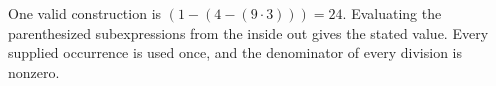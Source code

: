 One valid construction is $\boxed{(1-(4-(9\cdot 3)))=24}$. Evaluating the parenthesized subexpressions from the inside out gives the stated value. Every supplied occurrence is used once, and the denominator of every division is nonzero.
